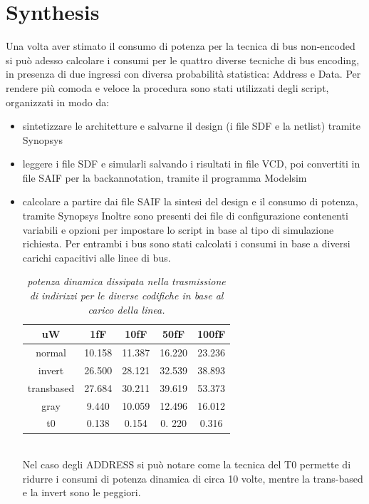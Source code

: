 \section{Synthesis}
Una volta aver stimato il consumo di potenza per la tecnica di bus non-encoded si può adesso calcolare i consumi per le quattro diverse tecniche di bus encoding, in presenza di due ingressi con diversa probabilità statistica: Address e Data.  
Per rendere più comoda e veloce la procedura sono stati utilizzati degli script, organizzati in modo da:
\begin{itemize}
\item{sintetizzare le architetture e salvarne il design (i file SDF e la netlist) tramite Synopsys}
\item{leggere i file SDF e simularli salvando i risultati in file VCD, poi convertiti in file SAIF per la backannotation, tramite il programma Modelsim}
\item{calcolare a partire dai file SAIF la sintesi del design e il consumo di potenza, tramite Synopsys}
Inoltre sono presenti dei file di configurazione contenenti variabili e opzioni per impostare lo script in base al tipo di simulazione richiesta.
Per entrambi i bus sono stati calcolati i consumi in  base a diversi carichi capacitivi alle linee di bus.
\\
\begin{table}[!h]\footnotesize
	\centering
	\begin{tabular}{|c|c|c|c|c|}
		\hline
		\textbf{uW} & \textbf{1fF} & \textbf{10fF} & \textbf{50fF} & \textbf{100fF}\\
		\hline
		normal & 10.158 & 11.387 & 16.220 & 23.236\\
		invert & 26.500 & 28.121 & 32.539  & 38.893\\
		transbased & 27.684 & 30.211 & 39.619 & 53.373\\
		gray & 9.440 & 10.059 & 12.496 & 16.012\\              
		t0 & 0.138 & 0.154 & 0. 220 & 0.316\\
		\hline
	\end{tabular}
	\caption{\textit{potenza dinamica dissipata nella trasmissione di indirizzi per le diverse codifiche in base al carico della linea.}}
\label{Tab9}
\end{table}
\\
Nel caso degli ADDRESS si può notare come la tecnica del T0 permette di ridurre i consumi di potenza dinamica di circa 10 volte, mentre la trans-based e la invert sono le peggiori.
\\

\end{itemize}
